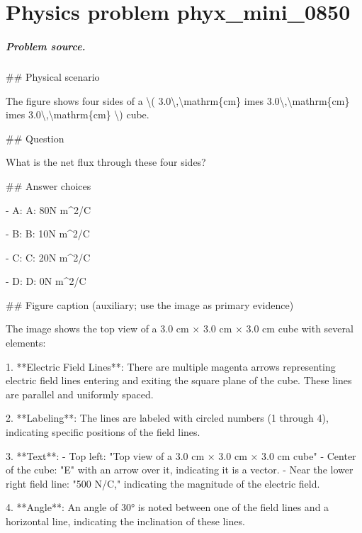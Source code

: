 
\chapter{Physics problem phyx\_mini\_0850}
\label{ch:PhyXMiniProblems_problem_phyx_mini_0850}

\paragraph{Problem source.}
\#\# Physical scenario

The figure shows four sides of a \textbackslash{}( 3.0\textbackslash{},\textbackslash{}mathrm\{cm\} 	imes 3.0\textbackslash{},\textbackslash{}mathrm\{cm\} 	imes 3.0\textbackslash{},\textbackslash{}mathrm\{cm\} \textbackslash{}) cube.

\#\# Question

What is the net flux through these four sides?

\#\# Answer choices

- A: A: 80N m\textasciicircum{}2/C

- B: B: 10N m\textasciicircum{}2/C

- C: C: 20N m\textasciicircum{}2/C

- D: D: 0N m\textasciicircum{}2/C

\#\# Figure caption (auxiliary; use the image as primary evidence)

The image shows the top view of a 3.0 cm × 3.0 cm × 3.0 cm cube with several elements:

1. **Electric Field Lines**: There are multiple magenta arrows representing electric field lines entering and exiting the square plane of the cube. These lines are parallel and uniformly spaced.

2. **Labeling**: The lines are labeled with circled numbers (1 through 4), indicating specific positions of the field lines.

3. **Text**: 
   - Top left: "Top view of a 3.0 cm × 3.0 cm × 3.0 cm cube"
   - Center of the cube: "E" with an arrow over it, indicating it is a vector.
   - Near the lower right field line: "500 N/C," indicating the magnitude of the electric field.

4. **Angle**: An angle of 30° is noted between one of the field lines and a horizontal line, indicating the inclination of these lines.

